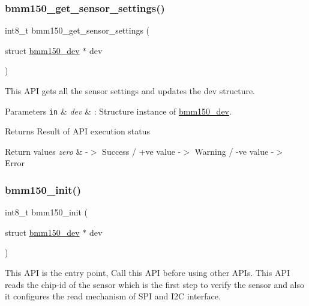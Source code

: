 \subsubsection{\texorpdfstring{bmm150\+\_\+get\+\_\+sensor\+\_\+settings()}{bmm150\_get\_sensor\_settings()}}
{\footnotesize\ttfamily int8\+\_\+t bmm150\+\_\+get\+\_\+sensor\+\_\+settings (\begin{DoxyParamCaption}\item[{struct \hyperlink{structbmm150__dev}{bmm150\+\_\+dev} $\ast$}]{dev }\end{DoxyParamCaption})}



This A\+PI gets all the sensor settings and updates the dev structure. 


\begin{DoxyParams}[1]{Parameters}
\mbox{\tt in}  & {\em dev} & \+: Structure instance of \hyperlink{structbmm150__dev}{bmm150\+\_\+dev}.\\
\hline
\end{DoxyParams}
\begin{DoxyReturn}{Returns}
Result of A\+PI execution status 
\end{DoxyReturn}

\begin{DoxyRetVals}{Return values}
{\em zero} & -\/$>$ Success / +ve value -\/$>$ Warning / -\/ve value -\/$>$ Error \\
\hline
\end{DoxyRetVals}
\mbox{\label{group___b_m_m150_gab4897d93fb8406c61d6bfab44de8c054}} 
\subsubsection{\texorpdfstring{bmm150\+\_\+init()}{bmm150\_init()}}
{\footnotesize\ttfamily int8\+\_\+t bmm150\+\_\+init (\begin{DoxyParamCaption}\item[{struct \hyperlink{structbmm150__dev}{bmm150\+\_\+dev} $\ast$}]{dev }\end{DoxyParamCaption})}



This A\+PI is the entry point, Call this A\+PI before using other A\+P\+Is. This A\+PI reads the chip-\/id of the sensor which is the first step to verify the sensor and also it configures the read mechanism of S\+PI and I2C interface. 

